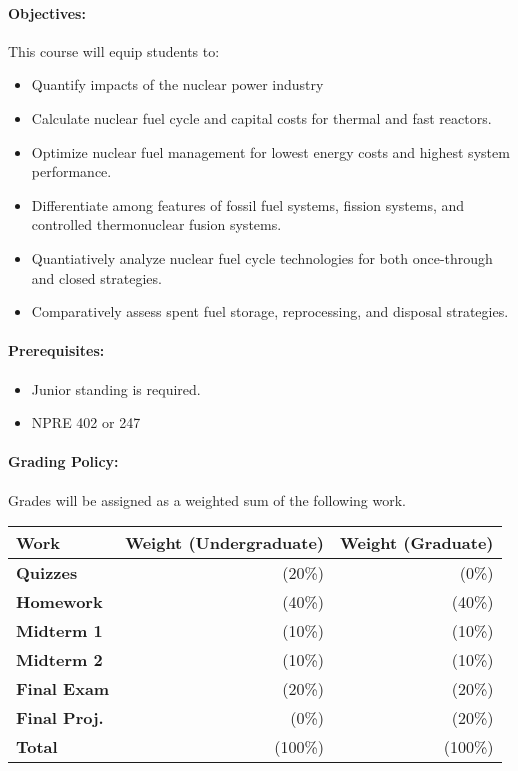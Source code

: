 \documentclass[11pt, a4paper]{article}
\begin{document}
\paragraph{Objectives:} 

This course will equip students to:

\begin{itemize}
\item Quantify impacts of the nuclear power industry
\item Calculate nuclear fuel cycle and capital costs for thermal and fast reactors.
\item Optimize nuclear fuel management for lowest energy costs and highest system performance.
\item Differentiate among features of fossil fuel systems, fission systems, and controlled thermonuclear fusion systems.
\item Quantiatively analyze nuclear fuel cycle technologies for both once-through and closed strategies.
\item Comparatively assess spent fuel storage, reprocessing, and disposal strategies.
\end{itemize}

\paragraph{Prerequisites:} 
\begin{itemize}
\item Junior standing is required.
\item NPRE 402 or 247
\end{itemize}

\paragraph{Grading Policy:} Grades will be assigned as a weighted sum of the 
following work.

\begin{table}[h]
\begin{tabularx}{\textwidth}{Xrr}
        \textbf{Work} & \textbf{Weight (Undergraduate)} & \textbf{Weight (Graduate)} \\
\hline
\textbf{Quizzes}     & (20\%)  & (0\%)\\
\textbf{Homework}    & (40\%)  & (40\%)\\
\textbf{Midterm 1}   & (10\%)  & (10\%)\\
\textbf{Midterm 2}   & (10\%)  & (10\%)\\
\textbf{Final Exam}  & (20\%)  & (20\%)\\
\textbf{Final Proj.} & (0\%)   & (20\%)\\
\hline
\textbf{Total}       & (100\%) & (100\%)\\
\end{tabularx}
\end{table}
\end{document}
